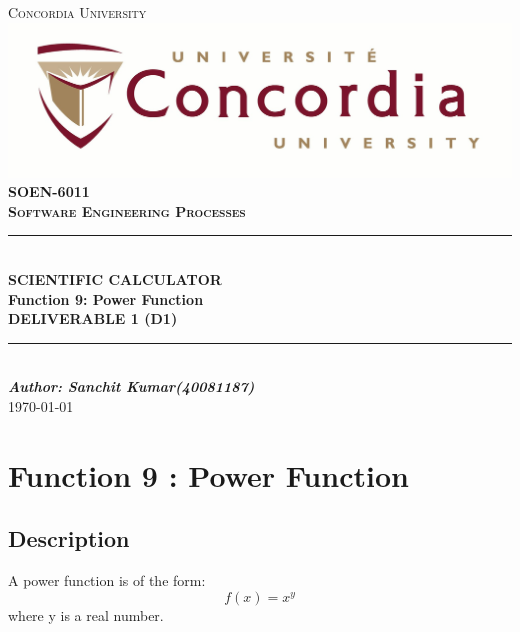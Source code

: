 \documentclass[a4paper,12pt]{article}
\newcommand{\Author}{Sanchit Kumar(40081187)}
\newcommand{\ProjectName}{Function 9: Power Function}
\newcommand{\Course}{\textbf{SOEN-6011 \\ Software Engineering Processes}}
\begin{document}

\begin{titlepage}
\newcommand{\HRule}{\rule{\linewidth}{0.5mm}} %


\centering
\textsc{\LARGE Concordia University} \\ [5mm] 
\includegraphics[scale=.1]{University_logo.jpg}\\[1cm] 
\textsc{\Large \Course} \\ [0.5cm]

	
\HRule \\[0.4cm]
{ \huge \bfseries SCIENTIFIC CALCULATOR \\ [5mm]  \ProjectName}\\[0.4cm] 
{\large \textbf{DELIVERABLE 1 (D1)} }	
\HRule \\[1.5cm]


\vspace{5cm}
\Large \emph{\textbf{Author: \Author}}\\
{\large \today}\\[2cm]

\vfill
\end{titlepage}	





\newpage

\section{\large Function 9 : Power Function}

\subsection{Description}
A power function is of the form:
\begin{equation} \label{Power_func}
f(x) = x^y
\end{equation}
where y is a real number.
\end{document}
